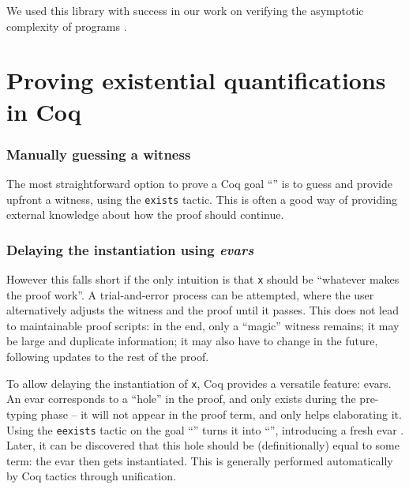 \documentclass[xetex,format=acmlarge,screen=true,authorversion=true]{acmart-modified}
\begin{document}
We used this library with success in our work on verifying the asymptotic
complexity of programs \cite{gueneau-chargueraud-pottier-coq-bigO}.

\section{Proving existential quantifications in Coq}

\subsubsection*{Manually guessing a witness}
%
The most straightforward option to prove a Coq goal ``'' is to
guess and provide upfront a witness, using the \texttt{exists} tactic. This is
often a good way of providing external knowledge about how the proof should
continue.

\subsubsection*{Delaying the instantiation using \emph{evars}}
%
However this falls short if the only intuition is that \texttt{x} should be
``whatever makes
the proof work''. A trial-and-error process can be attempted, where the user
alternatively adjusts the witness and the proof until it passes. This does not
lead to maintainable proof scripts: in the end, only a ``magic'' witness
remains; it may be large and duplicate information; it may also have to
change in the future, following updates to the rest of the proof.

To allow delaying the instantiation of \texttt{x}, Coq provides a versatile
feature: evars. An evar corresponds to a ``hole'' in the proof, and only exists
during the pre-typing phase -- it will not appear in the proof term, and only
helps elaborating it. Using the \texttt{eexists} tactic on the goal
``'' turns it into ``'', introducing a fresh evar
. Later, it can be discovered that this hole should be (definitionally)
equal to some term: the evar then gets instantiated. %
%
This is generally performed automatically by Coq tactics through unification.


\end{document}
